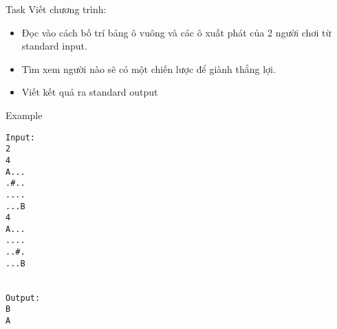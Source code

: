Task  
Viết chương trình:  
\begin{itemize}
	\item     Đọc vào cách bố trí bảng ô vuông và các ô xuất phát của 2 người chơi từ standard input.   
	\item     Tìm xem người nào sẽ có một chiến lược để giành thắng lợi.   
	\item     Viết kết quả ra standard output   
\end{itemize}
   Example  
\begin{verbatim}
Input:
2
4
A...
.#..
....
...B
4
A...
....
..#.
...B


Output:
B
A

\end{verbatim}